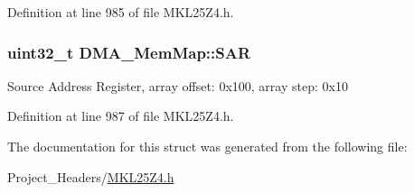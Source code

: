 Definition at line 985 of file M\+K\+L25\+Z4.\+h.

\subsubsection[{\texorpdfstring{S\+AR}{SAR}}]{\setlength{\rightskip}{0pt plus 5cm}uint32\+\_\+t D\+M\+A\+\_\+\+Mem\+Map\+::\+S\+AR}\hypertarget{struct_d_m_a___mem_map_a800d089db050cc5c5376f4fd1b8607f4}{}\label{struct_d_m_a___mem_map_a800d089db050cc5c5376f4fd1b8607f4}
Source Address Register, array offset\+: 0x100, array step\+: 0x10 

Definition at line 987 of file M\+K\+L25\+Z4.\+h.



The documentation for this struct was generated from the following file\+:\begin{DoxyCompactItemize}
\item 
Project\+\_\+\+Headers/\hyperlink{_m_k_l25_z4_8h}{M\+K\+L25\+Z4.\+h}\end{DoxyCompactItemize}

